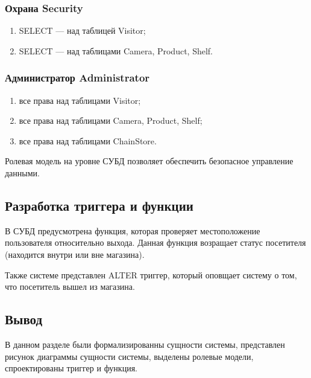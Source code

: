 \subsubsection{Охрана Security}

\begin{enumerate}[label=\arabic*.]
    \item SELECT --- над таблицей Visitor;
    \item SELECT --- над таблицами Camera, Product, Shelf.
\end{enumerate}


\subsubsection{Администратор Administrator}

\begin{enumerate}[label=\arabic*.]
    \item все права над таблицами Visitor;
    \item все права над таблицами Camera, Product, Shelf;
    \item все права над таблицами ChainStore.
\end{enumerate}

Ролевая модель на уровне СУБД позволяет обеспечить безопасное управление данными.

\subsection{Разработка триггера и функции}

В СУБД предусмотрена функция, которая проверяет местоположение пользователя относительно выхода. 
Данная функция возращает статус посетителя (находится внутри или вне магазина).

Также системе представлен ALTER триггер, который оповщает систему о том, 
что посетитель вышел из магазина.



\subsection*{Вывод}

В данном разделе были формализированны сущности системы, представлен рисунок диаграммы сущности системы,
выделены ролевые модели, спроектированы триггер и функция.
